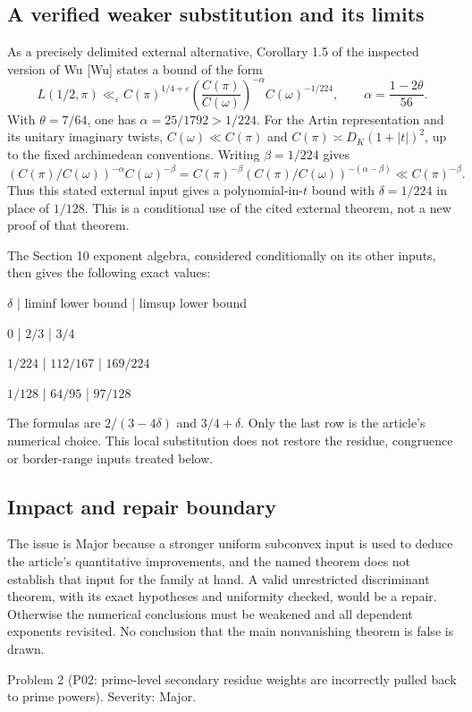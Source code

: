 \documentclass[10pt]{article}
\begin{document}
\subsection*{A verified weaker substitution and its limits}
As a precisely delimited external alternative, Corollary 1.5 of the inspected version of Wu [Wu] states a bound of the form \[L(1/2,\pi)\ll_{\varepsilon}
 C(\pi)^{1/4+\varepsilon}
 \left(\frac{C(\pi)}{C(\omega)}\right)^{-\alpha}
 C(\omega)^{-1/224},
 \qquad
 \alpha=\frac{1-2\theta}{56}.\] With \(\theta=7/64\), one has \(\alpha=25/1792>1/224\). For the Artin representation and its unitary imaginary twists, \(C(\omega)\ll C(\pi)\) and \(C(\pi)\asymp D_K(1+|t|)^2\), up to the fixed archimedean conventions. Writing \(\beta=1/224\) gives \[(C(\pi)/C(\omega))^{-\alpha}C(\omega)^{-\beta}
 =C(\pi)^{-\beta}
  (C(\pi)/C(\omega))^{-(\alpha-\beta)}
 \ll C(\pi)^{-\beta}.\] Thus this stated external input gives a polynomial-in-\(t\) bound with \(\delta=1/224\) in place of \(1/128\). This is a conditional use of the cited external theorem, not a new proof of that theorem.\par
The Section 10 exponent algebra, considered conditionally on its other inputs, then gives the following exact values:\par
\(\delta\) | liminf lower bound | limsup lower bound\par
\(0\) | \(2/3\) | \(3/4\)\par
\(1/224\) | \(112/167\) | \(169/224\)\par
\(1/128\) | \(64/95\) | \(97/128\)\par
The formulas are \(2/(3-4\delta)\) and \(3/4+\delta\). Only the last row is the article’s numerical choice. This local substitution does not restore the residue, congruence or border-range inputs treated below.\par
\subsection*{Impact and repair boundary}
The issue is Major because a stronger uniform subconvex input is used to deduce the article’s quantitative improvements, and the named theorem does not establish that input for the family at hand. A valid unrestricted discriminant theorem, with its exact hypotheses and uniformity checked, would be a repair. Otherwise the numerical conclusions must be weakened and all dependent exponents revisited. No conclusion that the main nonvanishing theorem is false is drawn.\par
Problem 2 (P02: prime-level secondary residue weights are incorrectly pulled back to prime powers).  Severity: Major.\par
\end{document}
